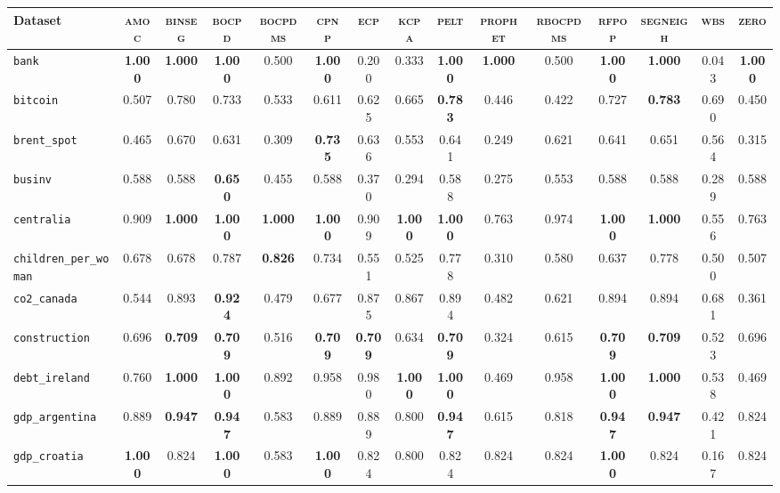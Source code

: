 \begin{tabular}{lcccccccccccccc}
Dataset & \textsc{amoc} & \textsc{binseg} & \textsc{bocpd} & \textsc{bocpdms} & \textsc{cpnp} & \textsc{ecp} & \textsc{kcpa} & \textsc{pelt} & \textsc{prophet} & \textsc{rbocpdms} & \textsc{rfpop} & \textsc{segneigh} & \textsc{wbs} & \textsc{zero}\\
\toprule
\verb+bank+ & \textbf{1.000} & \textbf{1.000} & \textbf{1.000} & 0.500 & \textbf{1.000} & 0.200 & 0.333 & \textbf{1.000} & \textbf{1.000} & 0.500 & \textbf{1.000} & \textbf{1.000} & 0.043 & \textbf{1.000}\\
\verb+bitcoin+ & 0.507 & 0.780 & 0.733 & 0.533 & 0.611 & 0.625 & 0.665 & \textbf{0.783} & 0.446 & 0.422 & 0.727 & \textbf{0.783} & 0.690 & 0.450\\
\verb+brent_spot+ & 0.465 & 0.670 & 0.631 & 0.309 & \textbf{0.735} & 0.636 & 0.553 & 0.641 & 0.249 & 0.621 & 0.641 & 0.651 & 0.564 & 0.315\\
\verb+businv+ & 0.588 & 0.588 & \textbf{0.650} & 0.455 & 0.588 & 0.370 & 0.294 & 0.588 & 0.275 & 0.553 & 0.588 & 0.588 & 0.289 & 0.588\\
\verb+centralia+ & 0.909 & \textbf{1.000} & \textbf{1.000} & \textbf{1.000} & \textbf{1.000} & 0.909 & \textbf{1.000} & \textbf{1.000} & 0.763 & 0.974 & \textbf{1.000} & \textbf{1.000} & 0.556 & 0.763\\
\verb+children_per_woman+ & 0.678 & 0.678 & 0.787 & \textbf{0.826} & 0.734 & 0.551 & 0.525 & 0.778 & 0.310 & 0.580 & 0.637 & 0.778 & 0.500 & 0.507\\
\verb+co2_canada+ & 0.544 & 0.893 & \textbf{0.924} & 0.479 & 0.677 & 0.875 & 0.867 & 0.894 & 0.482 & 0.621 & 0.894 & 0.894 & 0.681 & 0.361\\
\verb+construction+ & 0.696 & \textbf{0.709} & \textbf{0.709} & 0.516 & \textbf{0.709} & \textbf{0.709} & 0.634 & \textbf{0.709} & 0.324 & 0.615 & \textbf{0.709} & \textbf{0.709} & 0.523 & 0.696\\
\verb+debt_ireland+ & 0.760 & \textbf{1.000} & \textbf{1.000} & 0.892 & 0.958 & 0.980 & \textbf{1.000} & \textbf{1.000} & 0.469 & 0.958 & \textbf{1.000} & \textbf{1.000} & 0.538 & 0.469\\
\verb+gdp_argentina+ & 0.889 & \textbf{0.947} & \textbf{0.947} & 0.583 & 0.889 & 0.889 & 0.800 & \textbf{0.947} & 0.615 & 0.818 & \textbf{0.947} & \textbf{0.947} & 0.421 & 0.824\\
\verb+gdp_croatia+ & \textbf{1.000} & 0.824 & \textbf{1.000} & 0.583 & \textbf{1.000} & 0.824 & 0.800 & 0.824 & 0.824 & 0.824 & \textbf{1.000} & 0.824 & 0.167 & 0.824\\

\end{tabular}
